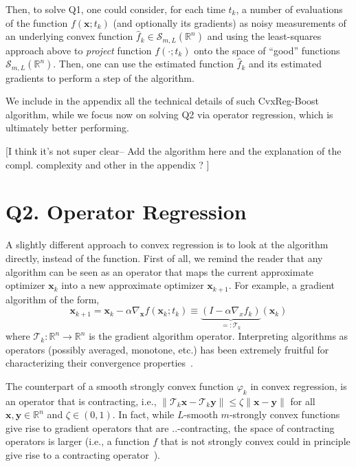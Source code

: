 \documentclass{article}
\newcommand{\R}{\mathbb{R}}
\newcommand{\x}{\mathbold{x}}
\newcommand{\y}{\mathbold{y}}
\newcommand{\T}{\mathcal{T}}
\newcommand{\andrea}[1]{{\color{red}[#1]}}
\begin{document}
Then, to solve Q1, one could consider, for each time $t_k$, a number of evaluations of the function $f(\x; t_k)$ (and optionally its gradients) as noisy measurements of an underlying convex function $\hat{f}_k \in \mathcal{S}_{m,L}(\R^n)$ and using the least-squares approach above to \emph{project} function $f(\cdot; t_k)$ onto the space of ``good'' functions $\mathcal{S}_{m,L}(\R^n)$. Then, one can use the estimated function $\hat{f}_k$ and its estimated gradients to perform a step of the algorithm. 

We include in the appendix all the technical details of such CvxReg-Boost algorithm, while we focus now on solving Q2 via operator regression, which is ultimately better performing. 

\andrea{I think it's not super clear-- Add the algorithm here and the explanation of the compl. complexity and other in the appendix ? }





\section{Q2. Operator Regression}\label{sec:opreg}

A slightly different approach to convex regression is to look at the algorithm directly, instead of the function. First of all, we remind the reader that any algorithm can be seen as an operator that maps the current approximate optimizer $\x_k$ into a new approximate optimizer $\x_{k+1}$. For example, a gradient algorithm of the form,
\begin{equation}
\x_{k+1} = \x_k - \alpha \nabla_{\x} f(\x_k; t_k) \equiv \underbrace{(I - \alpha \nabla_{x}f_k)}_{=:\T_k} (\x_k)
\end{equation}
where $\T_k: \R^n \to \R^n$ is the gradient algorithm operator. Interpreting algorithms as operators (possibly averaged, monotone, etc.) has been extremely fruitful for characterizing their convergence properties~\cite{Rockafellar1976, Eckstein1989, bauschke_convex_2017,Ryu2015,Sherson2018}.

The counterpart of a smooth strongly convex function $\varphi_k$ in convex regression, is an operator that is contracting, i.e., $\|\T_k \x - \T_k \y\| \leq \zeta \|\x - \y\|$ for all $\x, \y \in \R^n$ and $\zeta \in (0,1)$. In fact, while $L$-smooth $m$-strongly convex functions give rise to gradient operators that are $..$-contracting, the space of contracting operators is larger (i.e., a function $f$ that is not strongly convex could in principle give rise to a contracting operator~\cite{linear}). 
\end{document}
